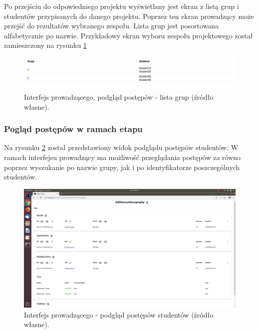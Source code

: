Po przejściu do odpowiedniego projektu wyświetlany jest ekran z listą grup i studentów przypisanych do danego projektu.
Poprzez ten ekran prowadzący może przejść do rezultatów wybranego zespołu.
Lista grup jest posortowana alfabetycznie po nazwie.
Przykładowy ekran wyboru zespołu projektowego został zamieszczony na rysunku \ref{fig:lecturer_preview_groups}

\begin{figure}[h]
    \centering
    \includegraphics[width = 13cm]{chapter04/lecturer_preview_groups.png}
    \caption{Interfejs prowadzącego, podgląd postępów - lista grup (źródło własne).}
    \label{fig:lecturer_preview_groups}
\end{figure}



\subsubsection{Pogląd postępów w ramach etapu}

Na rysunku \ref{fig:lecturer-interface-view} został przedstawiony widok podglądu postępów studentów.
W ramach interfejsu prowadzący ma możliwość przeglądania postępów za równo poprzez wyszukanie po nazwie grupy, jak i po identyfikatorze poszczególnych studentów.

\begin{figure}[h]
    \centering
    \includegraphics[width = 13cm]{chapter04/lecturer_interface_view.png}
    \caption{Interfejs prowadzącego - podgląd postępów studentów (źródło własne).}
    \label{fig:lecturer-interface-view}
\end{figure}

